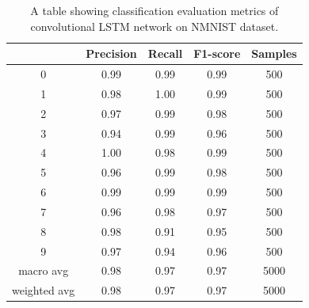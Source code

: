 \begin{table}[htb]
    \centering
    \begin{tabular}{|| c | c | c | c | c ||}
        \hline
             & Precision & Recall & F1-score & Samples \\
        \hline \hline
        0            & 0.99 & 0.99 & 0.99 & 500  \\
        \hline
        1            & 0.98 & 1.00 & 0.99 & 500  \\
        \hline
        2            & 0.97 & 0.99 & 0.98 & 500  \\
        \hline
        3            & 0.94 & 0.99 & 0.96 & 500  \\
        \hline
        4            & 1.00 & 0.98 & 0.99 & 500  \\
        \hline
        5            & 0.96 & 0.99 & 0.98 & 500  \\
        \hline
        6            & 0.99 & 0.99 & 0.99 & 500  \\
        \hline
        7            & 0.96 & 0.98 & 0.97 & 500  \\
        \hline
        8            & 0.98 & 0.91 & 0.95 & 500  \\
        \hline
        9            & 0.97 & 0.94 & 0.96 & 500  \\
        \hline
        macro avg    & 0.98 & 0.97 & 0.97 & 5000 \\
        \hline
        weighted avg & 0.98 & 0.97 & 0.97 & 5000 \\
        \hline
    \end{tabular}
    \caption{A table showing classification evaluation metrics of convolutional LSTM network on NMNIST dataset.}
    \label{tab:conv_lstm_nmnist_evaluation_metrics}
\end{table}

